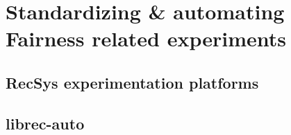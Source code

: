 
\chapter{Standardizing & automating Fairness related experiments}

\section{RecSys experimentation platforms}
\section{librec-auto}